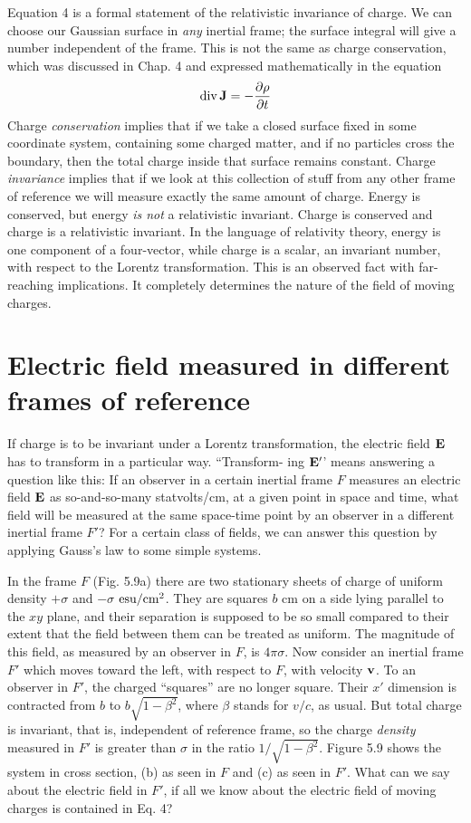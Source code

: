 Equation 4 is a formal statement of the relativistic invariance of
charge. We can choose our Gaussian surface in \emph{any} inertial frame;
the surface integral will give a number independent of the frame.
This is not the same as charge conservation, which was discussed in
Chap. 4 and expressed mathematically in the equation
\begin{equation*}
  \operatorname{div}\mathbf{J} = -\frac{\partial\rho}{\partial t}
\end{equation*}
Charge \emph{conservation} implies that if we take a closed surface fixed in
some coordinate system, containing some charged matter, and if no
particles cross the boundary, then the total charge inside that surface
remains constant. Charge \emph{invariance} implies that if we look at this
collection of stuff from any other frame of reference we will measure
exactly the same amount of charge. Energy is conserved, but energy
\emph{is not} a relativistic invariant. Charge is conserved and charge is a
relativistic invariant. In the language of relativity theory, energy is
one component of a four-vector, while charge is a scalar, an invariant
number, with respect to the Lorentz transformation. This is an observed
fact with far-reaching implications. It completely determines
the nature of the field of moving charges.

\section{Electric field measured in different frames of reference}

If charge is to be invariant under a Lorentz transformation, the
electric field $\mathbf{E}$ has to transform in a particular way. ``Transform-
ing $\mathbf{E}'$' means answering a question like this: If an observer in a certain
inertial frame $F$ measures an electric field $\mathbf{E}$ as so-and-so-many
statvolts/cm, at a given point in space and time, what field will be
measured at the same space-time point by an observer in a different
inertial frame $F'$? For a certain class of fields, we can answer this
question by applying Gauss's law to some simple systems.

In the frame $F$ (Fig. 5.9a) there are two stationary sheets of charge
of uniform density $+\sigma$ and $-\sigma$ $\textup{esu}/\textup{cm}^2$. They are
squares $b$ cm on a side lying parallel to the $xy$ plane, and their separation
is supposed to be so small compared to their extent that the field
between them can be treated as uniform. The magnitude of this
field, as measured by an observer in $F$, is $4\pi\sigma$. Now
consider an inertial frame $F'$ which moves toward the left, with
respect to $F$, with velocity $\mathbf{v}$. To an observer in $F'$, the charged
``squares'' are no longer square. Their $x'$ dimension is contracted
from $b$ to $b\sqrt{1-\beta^2}$, where $\beta$ stands for $v/c$, as usual. But total
charge is invariant, that is, independent of reference frame, so the
charge \emph{density} measured in $F'$ is greater than $\sigma$ in the ratio $1/\sqrt{1-\beta^2}$.
Figure 5.9 shows the system in cross section, (b) as seen in $F$ and (c)
as seen in $F'$. What can we say about the electric field in $F'$, if all
we know about the electric field of moving charges is contained in
Eq. 4?

